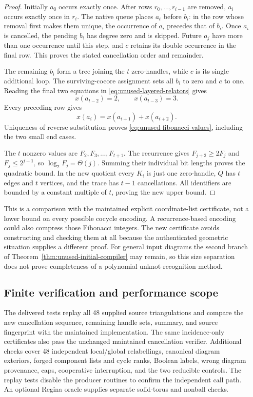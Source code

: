 \begin{proof}
Initially $a_0$ occurs exactly once.  After rows $r_0,\ldots,r_{i-1}$
are removed, $a_i$ occurs exactly once in $r_i$.  The native queue places
$a_i$ before $b_i$: in the row whose removal first makes them unique,
the occurrence of $a_i$ precedes that of $b_i$.  Once $a_i$ is cancelled,
the pending $b_i$ has degree zero and is skipped.  Future $a_j$ have more
than one occurrence until this step, and $c$ retains its double occurrence
in the final row.  This proves the stated cancellation order and remainder.

The remaining $b_i$ form a tree joining the $t$ zero-handles, while $c$
is its single additional loop.  The surviving-cocore assignment sets all
$b_i$ to zero and $c$ to one.  Reading the final two equations in
\eqref{eq:unused-layered-relators} gives
\[
 x(a_{t-2})=2,\qquad x(a_{t-3})=3.
\]
Every preceding row gives
\[
 x(a_i)=x(a_{i+1})+x(a_{i+2}).
\]
Uniqueness of reverse substitution proves \eqref{eq:unused-fibonacci-values},
including the two small end cases.

The $t$ nonzero values are $F_2,F_3,\ldots,F_{t+1}$.  The recurrence gives
$F_{j+2}\geq2F_j$ and $F_j\leq2^{j-1}$, so
$\log_2 F_j=\Theta(j)$.  Summing their individual bit lengths proves the
quadratic bound.  In the new quotient every $K_i$ is just one zero-handle,
$Q$ has $t$ edges and $t$ vertices, and the trace has $t-1$ cancellations.
All identifiers are bounded by a constant multiple of $t$, proving the
new upper bound.
\end{proof}

This is a comparison with the maintained explicit coordinate-list
certificate, not a lower bound on every possible cocycle encoding.  A
recurrence-based encoding could also compress those Fibonacci integers.
The new certificate avoids constructing and checking them at all because
the authenticated geometric situation supplies a different proof.
For general input diagrams the second branch of
Theorem~\ref{thm:unused-initial-compiler} may remain, so this size separation
does not prove completeness of a polynomial unknot-recognition method.

\subsection{Finite verification and performance scope}

The delivered tests replay all 48 supplied source triangulations and compare
the new cancellation sequence, remaining handle sets, summary, and source
fingerprint with the maintained implementation.  The same incidence-only
certificates also pass the unchanged maintained cancellation verifier.
Additional checks cover 48 independent local/global relabellings, canonical
diagram exteriors, forged component lists and cycle ranks, Boolean labels,
wrong diagram provenance, caps, cooperative interruption, and the two
reducible controls.  The replay tests disable the producer routines to
confirm the independent call path.  An optional Regina oracle supplies
separate solid-torus and nonball checks.

